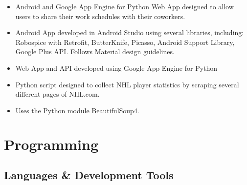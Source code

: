 \documentclass[11pt,letterpaper,sans]{moderncv}        %
\begin{document}
{
  \begin{itemize}
    \item Android and Google App Engine for Python Web App designed to allow users to share their work schedules with their coworkers.
    \item Android App developed in Android Studio using several libraries, including: Robospice with Retrofit, ButterKnife, Picasso, Android Support Library, Google Plus API. Follows Material design guidelines.
    \item Web App and API developed using Google App Engine for Python
  \end{itemize}
}

{
  \begin{itemize}
    \item Python script designed to collect NHL player statistics by scraping several different pages of NHL.com.
    \item Uses the Python module BeautifulSoup4.
  \end{itemize}
}


\vspace*{-0.5cm} %
\section{Programming}
\subsection{Languages \& Development Tools}

\end{document}
